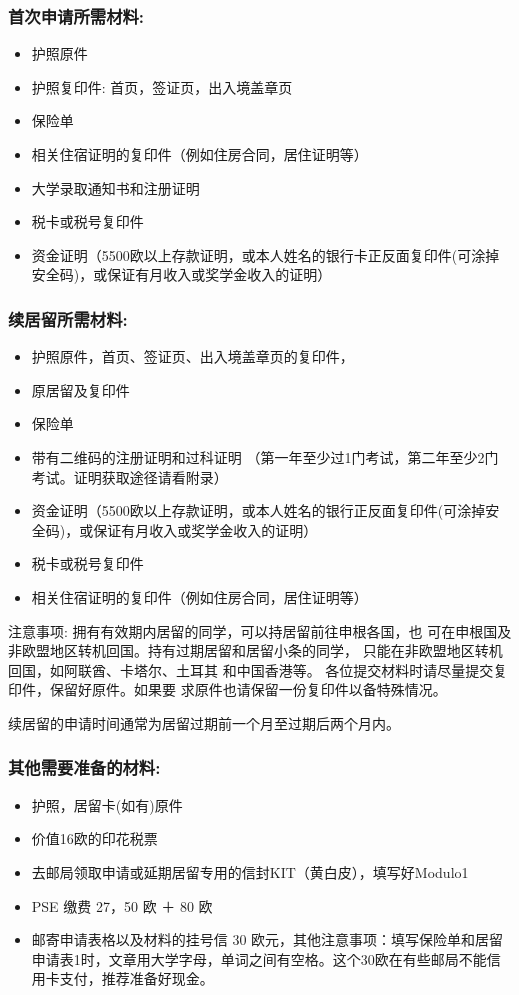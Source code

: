 \subsubsection{首次申请所需材料:}
\begin{itemize} 
\item 护照原件
\item 护照复印件: 首页，签证页，出入境盖章页
\item 保险单 
\item 相关住宿证明的复印件（例如住房合同，居住证明等）
\item 大学录取通知书和注册证明
\item 税卡或税号复印件
\item 资金证明（5500欧以上存款证明，或本人姓名的银行卡正反面复印件(可涂掉安全码)，或保证有月收入或奖学金收入的证明）
\end{itemize}

\subsubsection{续居留所需材料:}
\begin{itemize} 
\item 护照原件，首页、签证页、出入境盖章页的复印件，
\item 原居留及复印件
\item 保险单
\item 带有二维码的注册证明和过科证明  （第一年至少过1门考试，第二年至少2门考试。证明获取途径请看附录）
\item 资金证明（5500欧以上存款证明，或本人姓名的银行正反面复印件(可涂掉安全码)，或保证有月收入或奖学金收入的证明）
\item 税卡或税号复印件
\item 相关住宿证明的复印件（例如住房合同，居住证明等）
\end{itemize}
注意事项:
拥有有效期内居留的同学，可以持居留前往申根各国，也
可在申根国及非欧盟地区转机回国。持有过期居留和居留小条的同学，
只能在非欧盟地区转机回国，如阿联酋、卡塔尔、土耳其
和中国香港等。
各位提交材料时请尽量提交复印件，保留好原件。如果要
求原件也请保留一份复印件以备特殊情况。

续居留的申请时间通常为居留过期前一个月至过期后两个月内。 

\subsubsection{其他需要准备的材料:}
\begin{itemize} 
\item 护照，居留卡(如有)原件
\item 价值16欧的印花税票
\item 去邮局领取申请或延期居留专用的信封KIT（黄白皮），填写好Modulo1
\item PSE 缴费 27，50 欧 ＋ 80 欧
\item 邮寄申请表格以及材料的挂号信 30 欧元，其他注意事项：填写保险单和居留申请表1时，文章用大学字母，单词之间有空格。这个30欧在有些邮局不能信用卡支付，推荐准备好现金。
\end{itemize}


